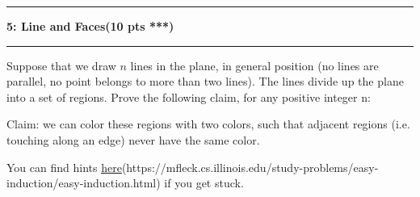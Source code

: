 \documentclass[11pt]{article}
\newcommand\question[2]{\vspace{.25in}\hrule\textbf{#1: #2}\vspace{.5em}\hrule\vspace{.10in}}
\begin{document}
\question{5}{Line and Faces(10 pts ***)}

 Suppose that we draw $n$ lines in the plane, in general position (no lines are parallel, no point belongs to more than two lines). The lines divide up the plane into a set of regions. Prove the following claim, for any positive integer n:

Claim: we can color these regions with two colors, such that adjacent regions (i.e. touching along an edge) never have the same color.

You can find hints \href{https://mfleck.cs.illinois.edu/study-problems/easy-induction/easy-induction.html}{here}(https://mfleck.cs.illinois.edu/study-problems/easy-induction/easy-induction.html) if you get stuck.
\end{document}
